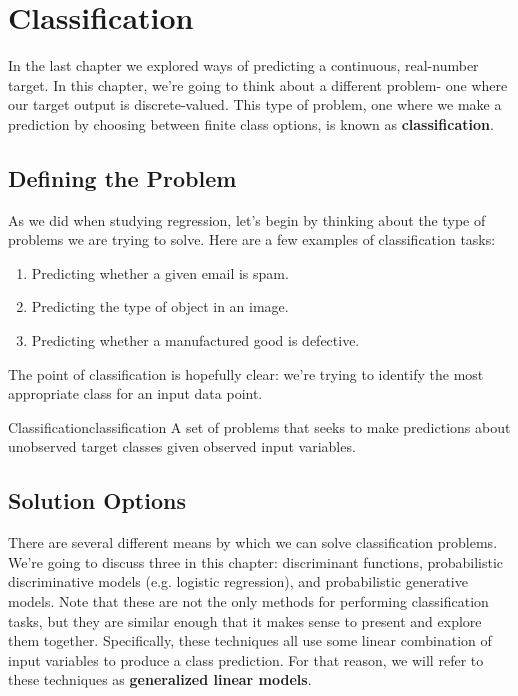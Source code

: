 \chapter{Classification}
In the last chapter we explored ways of predicting a continuous, real-number target. In this chapter, we're going to think about a different problem- one where our target output is discrete-valued. This type of problem, one where we make a prediction by choosing between finite class options, is known as \textbf{classification}.

\section{Defining the Problem}
As we did when studying regression, let's begin by thinking about the type of problems we are trying to solve. Here are a few examples of classification tasks:
\begin{enumerate}
    \item Predicting whether a given email is spam.
    \item Predicting the type of object in an image.
    \item Predicting whether a manufactured good is defective.
\end{enumerate}
The point of classification is hopefully clear: we're trying to identify the most appropriate class for an input data point.
\begin{definition}{Classification}{classification}
A set of problems that seeks to make predictions about unobserved target classes given observed input variables.
\end{definition}

\section{Solution Options}

There are several different means by which we can solve classification problems. We're going to discuss three in this chapter: discriminant functions, probabilistic discriminative models (e.g. logistic regression), and probabilistic generative models. Note that these are not the only methods for performing classification tasks, but they are similar enough that it makes sense to present and explore them together. Specifically, these techniques all use some linear combination of input variables to produce a class prediction. For that reason, we will refer to these techniques as \textbf{generalized linear models}.

